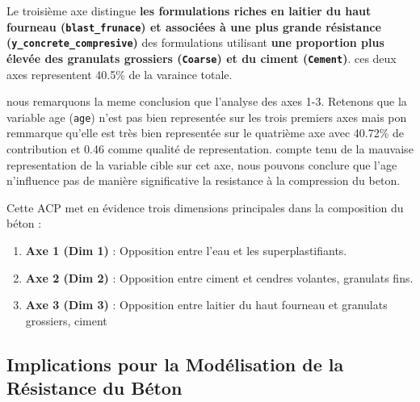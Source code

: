\documentclass[
  12pt,
]{article}
\providecommand{\tightlist}{%
  \setlength{\itemsep}{0pt}\setlength{\parskip}{0pt}}
\begin{document}
Le troisième axe distingue \textbf{les formulations riches en laitier du
haut fourneau (\texttt{blast\_frunace}) et associées à une plus grande
résistance (\texttt{y\_concrete\_compresive})} des formulations
utilisant \textbf{une proportion plus élevée des granulats grossiers
(\texttt{Coarse}) et du ciment (\texttt{Cement})}. ces deux axes
representent 40.5\% de la varaince totale.

nous remarquons la meme conclusion que l'analyse des axes 1-3. Retenons
que la variable age (\texttt{age}) n'est pas bien representée sur les
trois premiers axes mais pon remmarque qu'elle est très bien representée
sur le quatrième axe avec 40.72\% de contribution et 0.46 comme qualité
de representation. compte tenu de la mauvaise representation de la
variable cible sur cet axe, nous pouvons conclure que l'age n'influence
pas de manière significative la resistance à la compression du beton.

Cette ACP met en évidence trois dimensions principales dans la
composition du béton :

\begin{enumerate}
\def\labelenumi{\arabic{enumi}.}
\tightlist
\item
  \textbf{Axe 1 (Dim 1)} : Opposition entre l'eau et les
  superplastifiants.
\item
  \textbf{Axe 2 (Dim 2)} : Opposition entre ciment et cendres volantes,
  granulats fins.
\item
  \textbf{Axe 3 (Dim 3)} : Opposition entre laitier du haut fourneau et
  granulats grossiers, ciment
\end{enumerate}

\subsection{Implications pour la Modélisation de la Résistance du
Béton}\label{implications-pour-la-moduxe9lisation-de-la-ruxe9sistance-du-buxe9ton}
\end{document}
